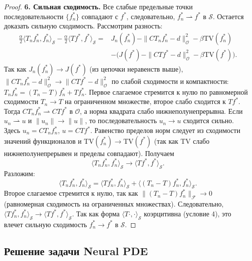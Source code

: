 \documentclass[a4paper,14pt,oneside,openany]{extarticle}
\begin{document}
\begin{proof}
\textbf{6. Сильная сходимость.}
Все слабые предельные точки последовательности $\{f_n^*\}$ совпадают с $f^*$, следовательно, $f_n^* \rightharpoonup f^*$ в $\mathcal{S}$.
Остается доказать сильную сходимость. Рассмотрим разность:
\begin{align*}
    \frac{\alpha}{2} \langle T_n f_n^*, f_n^*\rangle_{\mathcal{S}} - \frac{\alpha}{2} \langle T f^*, f^*\rangle_{\mathcal{S}}
    =& J_n(f_n^*) - \|C T_n f_n^* - d\|_{\mathcal{O}}^2 - \beta \mathrm{TV}(f_n^*) \\
    &- \bigl( J(f^*) - \|C T f^* - d\|_{\mathcal{O}}^2 - \beta \mathrm{TV}(f^*) \bigr).
\end{align*}
Так как $J_n(f_n^*) \to J(f^*)$ (из цепочки неравенств выше), $\|C T_n f_n^* - d\|_{\mathcal{O}}^2 
\to \|C T f^* - d\|_{\mathcal{O}}^2$ по слабой сходимости и компактности: $T_n f_n^* = (T_n - T) f_n^* + T f_n^*$. 
Первое слагаемое стремится к нулю по равномерной сходимости $T_n \to T$ на ограниченном множестве, второе слабо 
сходится к $T f^*$. Тогда $C T_n f_n^* \rightharpoonup C T f^*$ в $\mathcal{O}$, а норма квадрата слабо 
нижнеполунепрерывна. Если $u_n \rightharpoonup u$ и $\|u_n\| \to \|u\|$, то последовательность $u_n \to u$ сходится сильно. Здесь 
$u_n = C T_n f_n^*$, $u = C T f^*$. Равенство пределов норм следует из сходимости значений функционалов
и $\mathrm{TV}(f_n^*) \to \mathrm{TV}(f^*)$ (так как $\mathrm{TV}$ слабо нижнеполунепрерывен и пределы совпадают). Получаем
\begin{equation}
    \langle T_n f_n^*, f_n^*\rangle_{\mathcal{S}} \to \langle T f^*, f^*\rangle_{\mathcal{S}}.
\end{equation}
Разложим:
\begin{equation}
    \langle T_n f_n^*, f_n^*\rangle_{\mathcal{S}} = \langle T f_n^*, f_n^*\rangle_{\mathcal{S}} + \langle (T_n - T) f_n^*, f_n^*\rangle_{\mathcal{S}}.
\end{equation}
Второе слагаемое стремится к нулю, так как $\| (T_n - T) f_n^*\|_{\mathcal{F}} \to 0$ 
(равномерная сходимость на ограниченных множествах).
Следовательно, $\langle T f_n^*, f_n^*\rangle_{\mathcal{S}} \to \langle T f^*, f^*\rangle_{\mathcal{S}}$.
Так как форма $\langle T \cdot, \cdot\rangle_{\mathcal{S}}$ коэрцитивна (условие 4), 
это влечет сильную сходимость $f_n^* \to f^*$ в $\mathcal{S}$.
\end{proof}

\subsection{Решение задачи Neural PDE}
\end{document}
